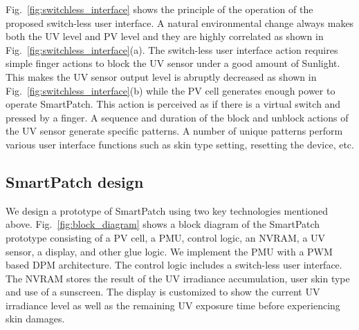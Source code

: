 \documentclass[journal]{IEEEtran}
\begin{document}
Fig.~\ref{fig:switchless_interface} shows the principle of the operation of the proposed switch-less user interface. A natural environmental change always makes both the UV level and PV level and they are highly correlated as shown in Fig.~\ref{fig:switchless_interface}(a). The switch-less user interface action requires simple finger actions to block the UV sensor under a good amount of Sunlight. This makes the UV sensor output level is abruptly decreased as shown in Fig.~\ref{fig:switchless_interface}(b) while the PV cell generates enough power to operate SmartPatch. This action is perceived as if there is a virtual switch and pressed by a finger. A sequence and duration of the block and unblock actions of the UV sensor generate specific patterns. A number of unique patterns perform various user interface functions such as skin type setting, resetting the device, etc.

\subsection{SmartPatch design}

We design a prototype of SmartPatch using two key technologies mentioned above.
Fig.~\ref{fig:block_diagram} shows a block diagram of the SmartPatch prototype consisting of a PV cell, a PMU, control logic, an NVRAM, a UV sensor, a display, and other glue logic. We implement the PMU with a PWM based DPM architecture. The control logic includes a switch-less user interface. The NVRAM stores the result of the UV irradiance accumulation, user skin type and use of a sunscreen. The display is customized to show the current UV irradiance level as well as the remaining UV exposure time before experiencing skin damages.

%
\end{document}
